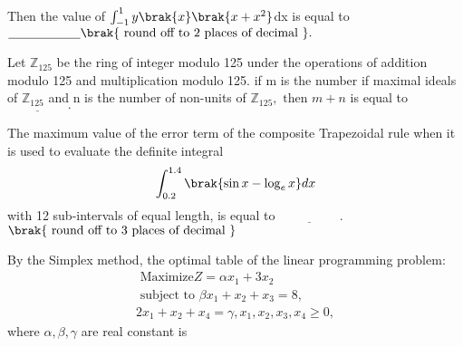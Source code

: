 Then the value of $\int_{-1}^{1}y\brak{x}\brak{x+x^{2}}$dx is equal to $\underline{\hspace{2cm}}\brak{\text{ round off to 2 places of decimal }}.$ 
\bigskip
\item Let $\mathbb{Z}_{125}$ be the ring of integer modulo 125 under the operations of addition modulo 125 and multiplication modulo 125. if m is the number if maximal ideals of $\mathbb{Z}_{125}$ and n is the number of non-units of $\mathbb{Z}_{125},\text{ then } m+n$ is equal to  $\underline{\hspace{2cm}}.$
\bigskip
\item The maximum value of the error term of the composite Trapezoidal rule when it is used to evaluate the definite integral 
\begin{align*}
    \int_{0.2}^{1.4}\brak{\sin x - \log_{e}x}dx
\end{align*}
with 12 sub-intervals of equal length, is equal to $\underline{\hspace{2cm}}.$ $\brak{\text{ round off to 3 places of decimal }}$
\bigskip
\item By the Simplex method, the optimal table of the linear programming problem:
\begin{align*}
    \text{ Maximize} Z=\alpha x_{1}+3x_{2}\\
    \text{ subject to } \beta x_{1}+x_{2}+x_{3}=8,\\
    2x_{1}+x_{2}+x_{4}=\gamma, x_{1},x_{2},x_{3},x_{4}\geq0,
\end{align*}
where $\alpha,\beta,\gamma$ are real constant is
